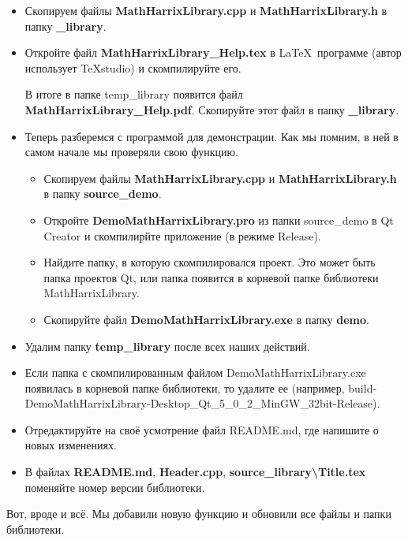 \documentclass[a4paper,12pt]{article}
\begin{document}
\begin{itemize}
\item Скопируем файлы \textbf{MathHarrixLibrary.cpp} и \textbf{MathHarrixLibrary.h} в папку \textbf{\_library}.

\item Откройте файл \textbf{MathHarrixLibrary\_Help.tex } в \LaTeX \ программе (автор использует TeXstudio) и скомпилируйте его.

В итоге в папке temp\_library появится файл \textbf{MathHarrixLibrary\_Help.pdf}. Скопируйте этот файл в папку \textbf{\_library}.

\item Теперь разберемся с программой для демонстрации. Как мы помним, в ней в самом начале мы проверяли свою функцию. 
\begin{itemize}
\item Скопируем файлы \textbf{MathHarrixLibrary.cpp} и \textbf{MathHarrixLibrary.h} в папку \textbf{source\_demo}.
\item  Откройте \textbf{DemoMathHarrixLibrary.pro} из папки source\_demo в Qt Creator и скомпилирйте приложение (в режиме Release).
\item Найдите папку, в которую скомпилировался проект. Это может быть папка проектов Qt, или папка появится в корневой папке библиотеки MathHarrixLibrary.
\item Скопируйте файл \textbf{DemoMathHarrixLibrary.exe} в папку \textbf{demo}.
\end{itemize}
\item Удалим папку \textbf{temp\_library} после всех наших действий.
\item  Если папка с скомпилированным файлом DemoMathHarrixLibrary.exe появилась в корневой папке библиотеки, то удалите ее (например, build-DemoMathHarrixLibrary-Desktop\_Qt\_5\_0\_2\_MinGW\_32bit-Release).
\item Отредактируйте на своё усмотрение файл README.md, где напишите о новых изменениях.
\item В файлах \textbf{README.md}, \textbf{Header.cpp}, \textbf{source\_library\textbackslash Title.tex} поменяйте номер версии библиотеки.
\end{itemize}

Вот, вроде и всё. Мы добавили новую функцию и обновили все файлы и папки библиотеки.

\newpage
\end{document}
